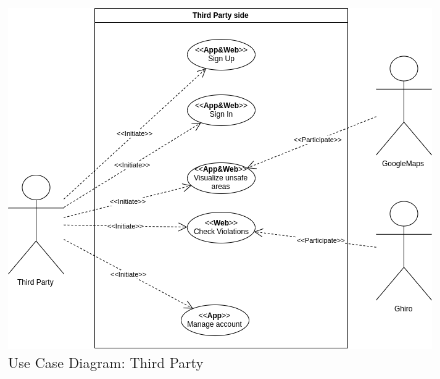 \documentclass{article}
\begin{document}
\begin{figure}[H]
    \centering
    \includegraphics[scale=0.5]{Images/UseCaseThirdPartyView}
    \caption{Use Case Diagram: Third Party}
\end{figure}
\end{document}
